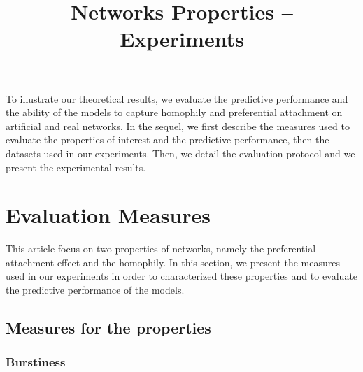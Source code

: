 \documentclass[a4paper, 12pt]{article}
\title{Networks Properties -- Experiments}
\begin{document}
\maketitle
\tableofcontents

To illustrate our theoretical results, we evaluate the predictive performance and the ability of the models to capture homophily and preferential attachment on artificial and real networks. In the sequel, we first describe the measures used to evaluate the properties of interest and the predictive performance, then the datasets used in our experiments. Then, we detail the evaluation protocol and we present the experimental results.

\section{Evaluation Measures}
This article focus on two properties of networks, namely the preferential attachment effect and the homophily. In this section, we present the measures used in our experiments in order to characterized these properties and to evaluate the predictive performance of the models.

\subsection{Measures for the properties}

\subsubsection{Burstiness}
\label{sec:experiments-burst}
\end{document}
